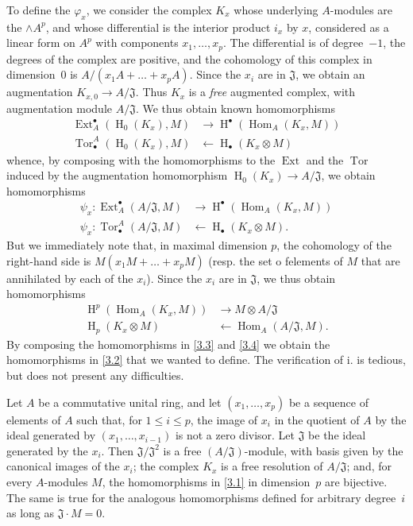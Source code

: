 \documentclass{article}
\theoremstyle{plain}
\newenvironment{proposition}[1]
    {\renewcommand\theinnercustomproposition{#1}\innercustomproposition}
    {\endinnercustomproposition}
\theoremstyle{definition}
\newcommand{\from}{\leftarrow}
\renewcommand{\leq}{\leqslant}
\DeclareMathOperator{\Ext}{Ext}
\DeclareMathOperator{\Hom}{Hom}
\DeclareMathOperator{\Tor}{Tor}
\DeclareMathOperator{\HH}{H}
\newcommand{\oldpage}[1]{\marginpar{\footnotesize$\Big\vert$ \textit{p.~#1}}}
\begin{document}
To define the $\varphi_x$, we consider the complex $K_x$ whose underlying $A$-modules are the $\wedge A^p$, and whose differential is the interior product $i_x$ by $x$, considered as a linear form on $A^p$ with components $x_1,\ldots,x_p$.
The differential is of degree~$-1$, the degrees of the complex are positive, and the cohomology of this complex in dimension~$0$ is $A/(x_1A+\ldots+x_pA)$.
Since the $x_i$ are in $\mathfrak{J}$, we obtain an augmentation $K_{x,0}\to A/\mathfrak{J}$.
Thus $K_x$ is a \emph{free} augmented complex, with augmentation module $A/\mathfrak{J}$.
We thus obtain known homomorphisms
\[
  \begin{aligned}
    \Ext_A^\bullet(\HH_0(K_x),M) &\to \HH^\bullet(\Hom_A(K_x,M))
  \\\Tor_\bullet^A(\HH_0(K_x),M) &\from \HH_\bullet(K_x\otimes M)
  \end{aligned}
\]
whence, by composing with the homomorphisms to the $\Ext$ and the $\Tor$ induced by the augmentation homomorphism $\HH_0(K_x)\to A/\mathfrak{J}$, we obtain homomorphisms
\[
\label{3.3}
  \begin{aligned}
    \psi_x\colon \Ext_A^\bullet(A/\mathfrak{J},M) &\to \HH^\bullet(\Hom_A(K_x,M))
  \\\psi_x\colon \Tor_\bullet^A(A/\mathfrak{J},M) &\from \HH_\bullet(K_x\otimes M).
  \end{aligned}
\tag{3.3}
\]
But we immediately note that, in maximal dimension $p$, the cohomology of the right-hand side is $M(x_1M+\ldots+x_pM)$ (resp. the set o felements of $M$ that are annihilated by each of the $x_i$).
Since the $x_i$ are in $\mathfrak{J}$, we thus obtain homomorphisms
\[
\label{3.4}
  \begin{aligned}
    \HH^p(\Hom_A(K_x,M)) &\to M\otimes A/\mathfrak{J}
  \\\HH_p(K_x\otimes M) &\from \Hom_A(A/\mathfrak{J},M).
  \end{aligned}
\tag{3.4}
\]
By composing the homomorphisms in \cref{3.3} and \cref{3.4} we obtain the homomorphisms in \cref{3.2} that we wanted to define.
The verification of i. is tedious, but does not present any difficulties.

\oldpage{149-07}
\begin{proposition}{4}
\label{proposition4}
  Let $A$ be a commutative unital ring, and let $(x_1,\ldots,x_p)$  be a sequence of elements of $A$ such that, for $1\leq i\leq p$, the image of $x_i$ in the quotient of $A$ by the ideal generated by $(x_1,\ldots,x_{i-1})$ is not a zero divisor.
  Let $\mathfrak{J}$ be the ideal generated by the $x_i$.
  Then $\mathfrak{J}/\mathfrak{J}^2$ is a free $(A/\mathfrak{J})$-module, with basis given by the canonical images of the $x_i$;
  the complex $K_x$ is a free resolution of $A/\mathfrak{J}$;
  and, for every $A$-modules $M$, the homomorphisms in \cref{3.1} in dimension~$p$ are bijective.
  The same is true for the analogous homomorphisms defined for arbitrary degree~$i$ as long as $\mathfrak{J}\cdot M=0$.
\end{proposition}
\end{document}
